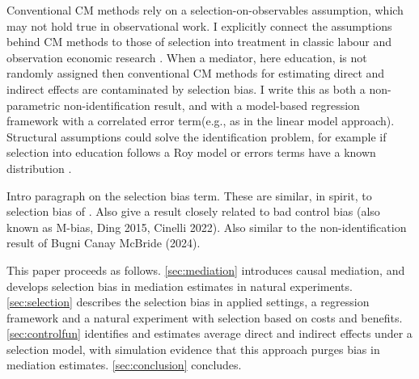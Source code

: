 Conventional CM methods rely on a selection-on-observables assumption, which may not hold true in observational work.
I explicitly connect the assumptions behind CM methods to those of selection into treatment in classic labour and observation economic research \citep{heckman2005structural}.
When a mediator, here education, is not randomly assigned then conventional CM methods for estimating direct and indirect effects are contaminated by selection bias.
I write this as both a non-parametric non-identification result, and with a model-based regression framework with a correlated error term(e.g., as in the \citealt{imai2010identification} linear model approach).
Structural assumptions could solve the identification problem, for example if selection into education follows a Roy model or errors terms have a known distribution \citep{heckman1979sample}.


Intro paragraph on the selection bias term.
These are similar, in spirit, to selection bias of \cite{heckman1998characterizing}.
Also give a result closely related to bad control bias (also known as M-bias, Ding 2015, Cinelli 2022).
Also similar to the non-identification result of Bugni Canay McBride (2024).





This paper proceeds as follows.
\autoref{sec:mediation} introduces causal mediation, and develops selection bias in mediation estimates in natural experiments.
\autoref{sec:selection} describes the selection bias in applied settings, a regression framework and a natural experiment with selection based on costs and benefits.
\autoref{sec:controlfun} identifies and estimates average direct and indirect effects under a selection model, with simulation evidence that this approach purges bias in mediation estimates.
\autoref{sec:conclusion} concludes.
